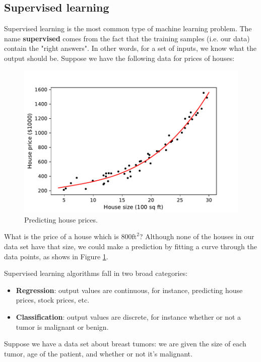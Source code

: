 \documentclass{article}
\theoremstyle{definition}
\begin{document}
\subsection{Supervised learning}
Supervised learning is the most common type of machine learning problem. The name \textbf{supervised} comes from the fact that the training samples (i.e. our data) contain the "right answers". In other words, for a set of inputs, we know what the output should be. Suppose we have the following data for prices of houses:

\begin{figure}[ht]
\centering
\includegraphics[scale=0.7]{images/lin_reg/poly-data.pdf}
\caption{Predicting house prices.}
\label{into-house-prices}
\end{figure}

What is the price of a house which is $800 \text{ft}^2$? Although none of the houses in our data set have that size, we could make a prediction by fitting a curve through the data points, as shows in Figure \ref{into-house-prices}.

Supervised learning algorithms fall in two broad categories:
\begin{itemize}
    \item \textbf{Regression}: output values are continuous, for instance, predicting house prices, stock prices, etc.
    \item \textbf{Classification}: output values are discrete, for instance whether or not a tumor is malignant or benign.
\end{itemize}

Suppose we have a data set about breast tumors: we are given the size of each tumor, age of the patient, and whether or not it's malignant.
\end{document}
